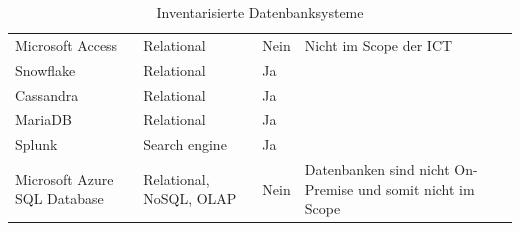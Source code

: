 \begin{flushleft}
\begin{table}[H]
{\begin{tabular}{@{}llll@{}}
    \Gls{Microsoft Access}             & Relational               & Nein                    & Nicht im Scope der ICT                                                        \\
    \Gls{Snowflake}                    & Relational               & Ja                      &                                                                               \\
    \Gls{Cassandra}                    & Relational               & Ja                      &                                                                               \\
    \Gls{MariaDB}                      & Relational               & Ja                      &                                                                               \\
    \Gls{Splunk}                       & Search engine            & Ja                      &                                                                               \\
    \Gls{Microsoft Azure SQL Database} & Relational, \Gls{NoSQL}, \Gls{OLAP}  & Nein                    & Datenbanken sind nicht On-Premise und somit nicht im Scope                    \\ \bottomrule
    \end{tabular}%
    }
    \caption{Inventarisierte Datenbanksysteme}
    \label{tab:Inventarisierte Datenbanksysteme}
    \end{table}
\end{flushleft}
\clearpage
{}
\recalctypearea
